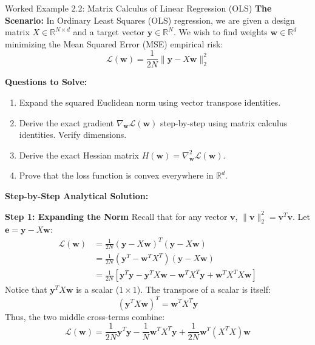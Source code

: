 \begin{examplebox}[breakable]{Worked Example 2.2: Matrix Calculus of Linear Regression (OLS)}
\label{ex:w02_ols_matrix_calculus}
\textbf{The Scenario:}
In Ordinary Least Squares (OLS) regression, we are given a design matrix $X \in \mathbb{R}^{N \times d}$ and a target vector $\mathbf{y} \in \mathbb{R}^N$. We wish to find weights $\mathbf{w} \in \mathbb{R}^d$ minimizing the Mean Squared Error (MSE) empirical risk:
\begin{equation*}
\mathcal{L}(\mathbf{w}) = \frac{1}{2N} \|\mathbf{y} - X\mathbf{w}\|_2^2
\end{equation*}

\textbf{Questions to Solve:}
\begin{enumerate}
    \item Expand the squared Euclidean norm using vector transpose identities.
    \item Derive the exact gradient $\nabla_{\mathbf{w}} \mathcal{L}(\mathbf{w})$ step-by-step using matrix calculus identities. Verify dimensions.
    \item Derive the exact Hessian matrix $H(\mathbf{w}) = \nabla^2_{\mathbf{w}} \mathcal{L}(\mathbf{w})$.
    \item Prove that the loss function is convex everywhere in $\mathbb{R}^d$.
\end{enumerate}

\tcblower
\textbf{Step-by-Step Analytical Solution:}

\textbf{Step 1: Expanding the Norm}
Recall that for any vector $\mathbf{v}$, $\|\mathbf{v}\|_2^2 = \mathbf{v}^T \mathbf{v}$. Let $\mathbf{e} = \mathbf{y} - X\mathbf{w}$:
\begin{align*}
\mathcal{L}(\mathbf{w}) &= \frac{1}{2N} (\mathbf{y} - X\mathbf{w})^T (\mathbf{y} - X\mathbf{w}) \\
&= \frac{1}{2N} \left( \mathbf{y}^T - \mathbf{w}^T X^T \right) (\mathbf{y} - X\mathbf{w}) \\
&= \frac{1}{2N} \left[ \mathbf{y}^T \mathbf{y} - \mathbf{y}^T X\mathbf{w} - \mathbf{w}^T X^T \mathbf{y} + \mathbf{w}^T X^T X \mathbf{w} \right]
\end{align*}
Notice that $\mathbf{y}^T X\mathbf{w}$ is a scalar ($1 \times 1$). The transpose of a scalar is itself:
\begin{equation*}
(\mathbf{y}^T X\mathbf{w})^T = \mathbf{w}^T X^T \mathbf{y}
\end{equation*}
Thus, the two middle cross-terms combine:
\begin{equation*}
\mathcal{L}(\mathbf{w}) = \frac{1}{2N} \mathbf{y}^T \mathbf{y} - \frac{1}{N} \mathbf{w}^T X^T \mathbf{y} + \frac{1}{2N} \mathbf{w}^T (X^T X) \mathbf{w}
\end{equation*}


\end{examplebox}
